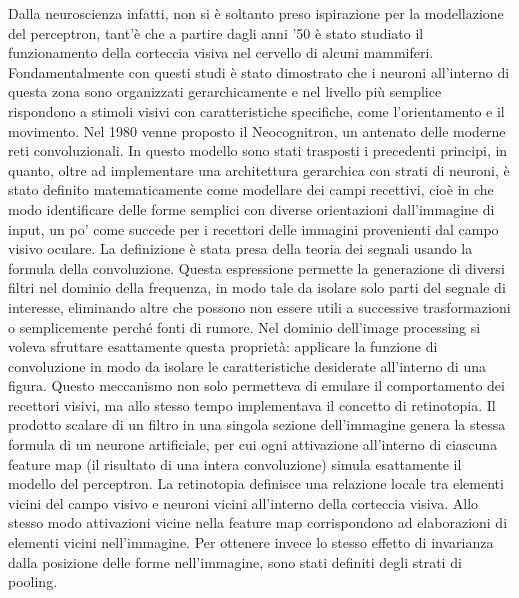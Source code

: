 Dalla neuroscienza infatti, non si è soltanto preso ispirazione per la modellazione del perceptron, tant'è che a partire dagli anni '50 è stato studiato il funzionamento della corteccia visiva nel cervello di alcuni mammiferi. Fondamentalmente con questi studi è stato dimostrato che i neuroni all'interno di questa zona sono organizzati gerarchicamente e nel livello più semplice rispondono a stimoli visivi con caratteristiche specifiche, come l'orientamento e il movimento. Nel 1980 venne proposto il Neocognitron, un antenato delle moderne reti convoluzionali. In questo modello sono stati trasposti i precedenti principi, in quanto, oltre ad implementare una architettura gerarchica con strati di neuroni, è stato definito matematicamente come modellare dei campi recettivi, cioè in che modo identificare delle forme semplici con diverse orientazioni dall'immagine di input, un po' come succede per i recettori delle immagini provenienti dal campo visivo oculare. La definizione è stata presa della teoria dei segnali usando la formula della convoluzione. Questa espressione permette la generazione di diversi filtri nel dominio della frequenza, in modo tale da isolare solo parti del segnale di interesse, eliminando altre che possono non essere utili a successive trasformazioni o semplicemente perché fonti di rumore. Nel dominio dell'image processing si voleva sfruttare esattamente questa proprietà: applicare la funzione di convoluzione in modo da isolare le caratteristiche desiderate all'interno di una figura. Questo meccanismo non solo permetteva di emulare il comportamento dei recettori visivi, ma allo stesso tempo implementava il concetto di retinotopia. Il prodotto scalare di un filtro in una singola sezione dell'immagine genera la stessa formula di un neurone artificiale, per cui ogni attivazione all'interno di ciascuna feature map (il risultato di una intera convoluzione) simula esattamente il modello del perceptron. La retinotopia definisce una relazione locale tra elementi vicini del campo visivo e neuroni vicini all'interno della corteccia visiva. Allo stesso modo attivazioni vicine nella feature map corrispondono ad elaborazioni di elementi vicini nell'immagine. Per ottenere invece lo stesso effetto di invarianza dalla posizione delle forme nell'immagine, sono stati definiti degli strati di pooling. 

